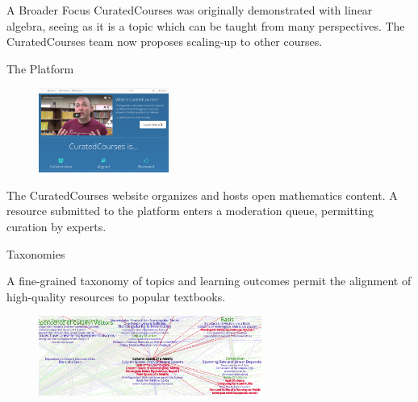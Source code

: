 
\begin{sectionblock}{A Broader Focus}
  CuratedCourses was originally demonstrated with linear algebra,
  seeing as it is a topic which can be taught from many perspectives.
  The CuratedCourses team now proposes scaling-up to other courses.
\end{sectionblock}

\begin{sectionblock}{The Platform}

  \begin{figure}
    \includegraphics[width=0.38\textwidth]{landing-page.png}
  \end{figure}

  The CuratedCourses website organizes and hosts open mathematics content.  A resource submitted to the
  platform enters a moderation queue, permitting curation by experts.
\end{sectionblock}
  
  \begin{sectionblock}{Taxonomies}
  
    A fine-grained taxonomy of
   topics and learning outcomes
  permit the alignment of high-quality resources to popular textbooks.

    \begin{figure}
      \includegraphics[width=0.65\textwidth]{topics.png}
    \end{figure}
  
\end{sectionblock}


    
